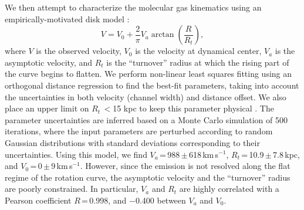 \documentclass[]{emulateapj}
\newcommand{\kms}{\mbox{km\,s$^{-1}$}\xspace}
\newcommand{\eg}{{e.g.,~}}
\begin{document}
We then attempt to characterize the molecular gas kinematics using an
empirically-motivated disk model \citep[\eg][]{Courteau97a,Puech08a,Miller11a}:
\begin{equation}
V = V_0 + \frac{2}{\pi} V_{a} \arctan(\frac{R}{R_{t}}),
\end{equation}
where $V$ is the observed velocity, $V_0$ is the velocity at dynamical center,
$V_{a}$ is the asymptotic velocity, and $R_{t}$ is the ``turnover''
radius at which the rising part of the curve begins to flatten.
We perform non-linear least squares fitting using an orthogonal distance
regression to find the best-fit parameters,
taking into account the uncertainties in both velocity (channel width) and
distance offset. We also place an upper limit on $R_{t}$\,$<$15 kpc
to keep this parameter physical \citep[\eg][]{Puech08a,Miller11a}.
The parameter uncertainties are inferred based on a Monte Carlo simulation
of 500 iterations, where the input parameters are perturbed
according to random Gaussian distributions with standard deviations
corresponding to their uncertainties.
Using this model, we find $V_{a}$\,=\,988\,$\pm$\,618\,\kms,
$R_{t}$\,=\,10.9\,$\pm$\,7.8\,kpc, and $V_0$\,=\,0\,$\pm$\,9\,\kms.
However, since the emission is not resolved along the flat regime
of the rotation curve, the asymptotic velocity
and the ``turnover'' radius are poorly constrained.
In particular, $V_{a}$ and $R_{t}$ are highly correlated with a
Pearson coefficient $R$\,=\,0.998, and $-$0.400 between $V_{a}$ and $V_0$.
\end{document}
